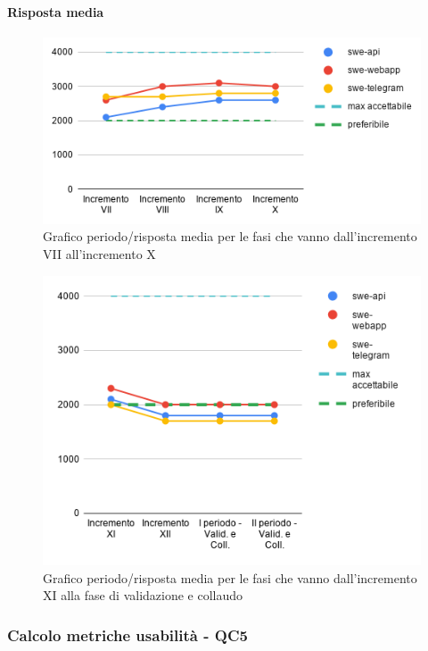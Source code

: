 \paragraph{Risposta media}
	\begin{figure}[H]
			\centering
			\includegraphics[width=0.8\linewidth]{./res/images/QM-PROD-8-RM.png}
			\caption{Grafico periodo/risposta media per le fasi che vanno dall'incremento VII all'incremento X}
			\label{fig:Grafico periodo/risposta media per le fasi che vanno dall'incremento VII all'incremento X}
	\end{figure}
	\begin{figure}[H]
			\centering
			\includegraphics[width=0.8\linewidth]{./res/images/QM-PROD-8-RM_1.png}
			\caption{Grafico periodo/risposta media per le fasi che vanno dall'incremento XI alla fase di validazione e collaudo}
			\label{fig:Grafico periodo/risposta media per le fasi che vanno dall'incremento XI alla fase di validazione e collaudo}
	\end{figure}

\subsubsection{Calcolo metriche usabilità - QC5}
